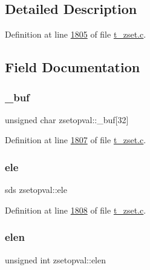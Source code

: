 \subsection{Detailed Description}


Definition at line \hyperlink{t__zset_8c_source_l01805}{1805} of file \hyperlink{t__zset_8c_source}{t\+\_\+zset.\+c}.



\subsection{Field Documentation}
\mbox{\label{structzsetopval_a34e7123e4ee0da8943148e67ec1a0f20}} 
\subsubsection{\texorpdfstring{\+\_\+buf}{\_buf}}
{\footnotesize\ttfamily unsigned char zsetopval\+::\+\_\+buf\mbox{[}32\mbox{]}}



Definition at line \hyperlink{t__zset_8c_source_l01807}{1807} of file \hyperlink{t__zset_8c_source}{t\+\_\+zset.\+c}.

\mbox{\label{structzsetopval_af9ee5dba4ef86a841f96f55a425a0d34}} 
\subsubsection{\texorpdfstring{ele}{ele}}
{\footnotesize\ttfamily sds zsetopval\+::ele}



Definition at line \hyperlink{t__zset_8c_source_l01808}{1808} of file \hyperlink{t__zset_8c_source}{t\+\_\+zset.\+c}.

\mbox{\label{structzsetopval_ae2f09f119f4c41277e1e42aa04fffdcd}} 
\subsubsection{\texorpdfstring{elen}{elen}}
{\footnotesize\ttfamily unsigned int zsetopval\+::elen}




